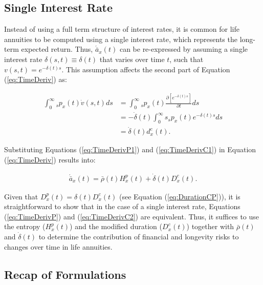 \documentclass[12pt]{article}
\begin{document}
{\subsection{Single Interest Rate}

Instead of using a full term structure of interest rates, it is common for life annuities to be computed using a single interest rate, which represents the long-term expected return. Thus, $\acute{\bar{a}}_x(t)$ can be re-expressed by assuming a single interest rate $\delta(s,t)\equiv \delta(t)$ that varies over time $t$, such that $v(s,t) = e^{-\delta(t) s}$. This assumption affects the second part of Equation (\ref{eq:TimeDeriv}) as:


\begin{equation}\label{eq:TimeDerivC1}
\begin{split}
\int_0^\infty {}_s{p}_x(t) \dot{v}(s,t)ds &=\int_0^\infty {}_s{p}_x(t) \frac{\partial \left[ e^{-\delta(t)s} \right]}{\partial t}ds \\
&=-\dot{\delta}(t)\int_0^\infty s  {}_s{p}_x(t) e^{-\delta(t)s} ds \\
&=  \dot{\delta}(t)  d^{c}_x(t).
\end{split}
\end{equation}

Substituting Equations (\ref{eq:TimeDerivP1}) and (\ref{eq:TimeDerivC1}) in Equation (\ref{eq:TimeDeriv}) results into: 


\begin{equation}\label{eq:TimeDerivC2}
\begin{split}
\acute{\bar{a}}_x(t) =  \bar{\rho}(t){H}^{p}_x(t)+\dot{\delta}(t)  D^{c}_x(t).
\end{split}
\end{equation}


Given that ${D}^{p}_{x}(t) = \delta(t){D}^{c}_{x}(t)$ (see Equation (\ref{eq:DurationCP})), it is straightforward to show that in the case of a single interest rate, Equations (\ref{eq:TimeDerivP}) and (\ref{eq:TimeDerivC2}) are equivalent. Thus, it suffices to use the entropy (${H}^{p}_x(t)$) and the modified duration (${D}^{c}_x(t)$) together with $\bar{\rho}(t)$ and $\dot{\delta}(t)$ to determine the contribution of financial and longevity risks to changes over time in life annuities.




\subsection{Recap of Formulations}

}
\end{document}
